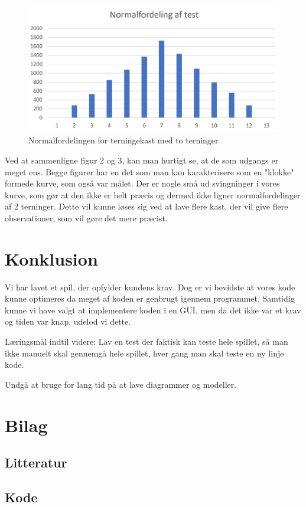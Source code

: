 \documentclass{article}
\begin{document}
\begin{figure} [h]
    \centering
    \includegraphics{Billeder/test af terninger.png}
    \caption {Normalfordelingen for terningekast med to terninger}
    \label{fig: Normalfordelingenm for terningekast}
\end{figure}
\item
\item
\item
\item
\item
\item
Ved at sammenligne figur 2 og 3, kan man hurtigt se, at de som udgangs er meget ens. Begge figurer har en det som man kan karakterisere som en "klokke" formede kurve, som også var målet. Der er nogle små ud svingninger i vores kurve, som gør at den ikke er helt præcis og dermed ikke ligner normalfordelinger af 2 terninger. Dette vil kunne løses sig ved at lave flere kast, der vil give flere observationer, som vil gøre det mere præcist. 


\section{Konklusion}
Vi har lavet et spil, der opfylder kundens krav. Dog er vi bevidste at vores kode kunne optimeres da meget af koden er genbrugt igennem programmet. Samtidig kunne vi have valgt at implementere koden i en GUI, men da det ikke var et krav og tiden var knap, udelod vi dette.
\item Læringsmål indtil videre:
Lav en test der faktisk kan teste hele spillet, så man ikke manuelt skal gennemgå hele spillet, hver gang man skal teste en ny linje kode.
\item Undgå at bruge for lang tid på at lave diagrammer og modeller. 


\section{Bilag}
\subsection{Litteratur}
\subsection{Kode}
\end{document}
